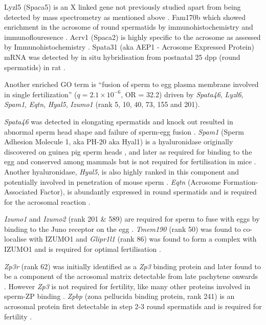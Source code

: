 Lyzl5 (Spaca5) is an X linked gene not previously studied apart from being detected by mass spectrometry as mentioned above \parencite{Guyonnet2012Isolation}.
Fam170b which showed enrichment in the acrosome of round spermatids by immunohistochemistry and immunoflouresence \parencite{Li2015FAM170B}.
Acrv1 (Spaca2) is highly specific to the acrosome as assessed by Immunohistochemistry \parencite{Osuru2014acrosomal}.
Spata31 (aka AEP1 - Acrosome Expressed Protein) mRNA was detected by in situ hybridisation from postnatal 25 dpp (round spermatids) in rat \parencite{Luk2006Acrosomespecific}.
 
Another enriched GO term is ``fusion of sperm to egg plasma membrane involved in single fertilization'' ($q = 2.1\times10^{-6}$, OR = 32.2) driven by \textit{Spata46}, \textit{Lyzl6}, \textit{Spam1}, \textit{Eqtn}, \textit{Hyal5}, \textit{Izumo1} (rank 5, 10, 40, 73, 155 and 201).

\textit{Spata46} was detected in elongating spermatids and knock out resulted in abnormal sperm head shape and failure of sperm-egg fusion \parencite{Chen2016Deficiency}.
\textit{Spam1} (Sperm Adhesion Molecule 1, aka PH-20 aka Hyal1) is a hyaluronidase originally discovered on guinea pig sperm heads \parencite{Myles1981Surface}, and later as required for binding to the egg \parencite{Primakoff1985role} and conserved among mammals \parencite{Lathrop1990cDNA} but is not required for fertilisation in mice \parencite{Baba2002Mouse}.
Another hyaluronidase, \textit{Hyal5}, is also highly ranked in this component and potentially involved in penetration of mouse sperm \parencite{Kim2005Identification, Kimura2009Functional}.
\textit{Eqtn} (Acrosome Formation-Associated Factor), is abundantly expressed in round spermatids and is required for the acrosomal reaction \parencite{Li2006Afaf, Hao2014Equatorin}.

\textit{Izumo1} and \textit{Izumo2} (rank 201 \& 589) are required for sperm to fuse with eggs by binding to the Juno receptor on the egg \parencite{Inoue2005immunoglobulin, Bianchi2014Juno}.
\textit{Tmem190} (rank 50) was found to co-localise with IZUMO1 \parencite{Nishimura2011Characterization} and \textit{Glipr1l1} (rank 86) was found to form a complex with IZUMO1 and is required for optimal fertilisation \parencite{Gibbs2010Glioma,Gaikwad2019GLIPR1L1}.

\textit{Zp3r} (rank 62) was initially identified as a \textit{Zp3} binding protein \parencite{Bleil1990Identification} and later found to be a component of the acrosomal matrix detectable from late pachytene onwards \parencite{Kim2001Mouse}.
However \textit{Zp3} is not required for fertility, like many other proteins involved in sperm-ZP binding \parencite{Muro2012Function}.
\textit{Zpbp} (zona pellucida binding protein, rank 241) is an acrosomal protein first detectable in step 2-3 round spermatids and is required for fertility \parencite{Lin2007Loss}.

